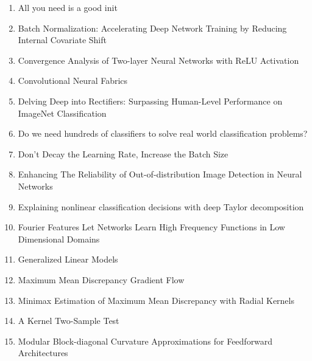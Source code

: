 \documentclass[acmlarge]{acmart}
\begin{document}
\begin{enumerate}
	\item All you need is a good init \cite{Mishkin2016AllYN} 

	\item Batch Normalization: Accelerating Deep Network Training by Reducing Internal Covariate Shift \cite{Ioffe2015BatchNA} 

	\item Convergence Analysis of Two-layer Neural Networks with ReLU Activation \cite{Li2017ConvergenceAO} 

	\item Convolutional Neural Fabrics \cite{Saxena2016ConvolutionalNF} 

	\item Delving Deep into Rectifiers: Surpassing Human-Level Performance on ImageNet Classification \cite{He2015DelvingDI} 

	\item Do we need hundreds of classifiers to solve real world classification problems? \cite{Delgado2014DoWN} 

	\item Don't Decay the Learning Rate, Increase the Batch Size \cite{Smith2018DontDT} 

	\item Enhancing The Reliability of Out-of-distribution Image Detection in Neural Networks \cite{Liang2018EnhancingTR} 

	\item Explaining nonlinear classification decisions with deep Taylor decomposition \cite{Montavon2017ExplainingNC} 

	\item Fourier Features Let Networks Learn High Frequency Functions in Low Dimensional Domains \cite{Tancik2020FourierFL} 

	\item Generalized Linear Models \cite{McCullagh1972GeneralizedLM} 

	\item Maximum Mean Discrepancy Gradient Flow \cite{Arbel2019MaximumMD} 

	\item Minimax Estimation of Maximum Mean Discrepancy with Radial Kernels \cite{Tolstikhin2016MinimaxEO} 

	\item A Kernel Two-Sample Test \cite{Gretton2012AKT} 

	\item Modular Block-diagonal Curvature Approximations for Feedforward Architectures \cite{Dangel2020ModularBC} 


\end{enumerate}
\end{document}
